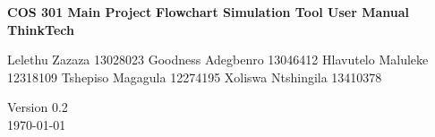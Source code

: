 \begin{titlepage}
	\begin{center}
		
		\begin{figure}[t]
			\centering
		\end{figure}		
	
	
	\begin{flushright} 
		
		\textbf{\LARGE COS 301 Main Project}
		\newline \newline \newline
		\textbf{\LARGE Flowchart Simulation Tool User Manual}
		\newline \newline \newline
 		\textbf{\LARGE ThinkTech}
		\newline \newline \newline
	\end{flushright}
	
	\begin{flushright} \large
			Lelethu Zazaza 13028023\newline
			Goodness Adegbenro 13046412\newline
			Hlavutelo Maluleke 12318109\newline
			Tshepiso Magagula 12274195\newline
			Xoliswa Ntshingila 13410378\newline
	\end{flushright}
		
		\vspace{1 cm}
		

		
		\vfill
		
		{\LARGE Version 0.2}
		\\
		{\large \today}		
		
		
	\end{center}
\end{titlepage}

